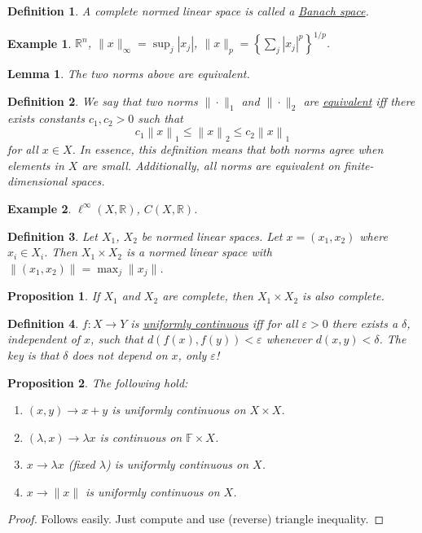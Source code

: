 \documentclass[letterpaper,twoside,11pt]{article}
\theoremstyle{mystyle}
\newtheorem{definition}{Definition}[section]
\newtheorem{lemma}[theorem]{Lemma}
\newtheorem{prop}{Proposition}[section]
\newtheorem*{ex}{Example}
\newcommand{\R}{{\mathbb R}}
\begin{document}
\begin{definition}
  A complete normed linear space is called a \underline{Banach space}. 
\end{definition}
\begin{ex}
  $\R^n$, $\|x\|_\infty = \sup_j |x_j|$, $\|x\|_p = \left\{\sum_j |x_j|^p\right\}^{1/p}$. 
\end{ex}
\begin{lemma}
  The two norms above are equivalent. 
\end{lemma}
\begin{definition}
  We say that two norms $\|\cdot\|_1$ and $\|\cdot\|_2$ are \underline{equivalent} iff there exists constants $c_1, c_2>0$ such that 
  \[{c_1}{\left\| x \right\|_1} \leq {\left\| x \right\|_2} \leq {c_2}{\left\| x \right\|_1}\] for all $x\in X$. 
  In essence, this definition means that both norms agree when elements in $X$ are small. Additionally, all norms are equivalent on finite-dimensional spaces. 
\end{definition}
\begin{ex}
  $\ell^\infty (X,\R)$, $C(X,\R)$. 
\end{ex}
\begin{definition}
  Let $X_1$, $X_2$ be normed linear spaces. Let $x = (x_1, x_2)$ where $x_i\in X_i$. Then $X_1 \times X_2$ is a normed linear space with $\|(x_1, x_2)\| = \max_j \|x_j\|$. 
\end{definition}
\begin{prop}
  If $X_1$ and $X_2$ are complete, then $X_1\times X_2$ is also complete. 
\end{prop}
\begin{definition}
  $f:X\to Y$ is \underline{uniformly continuous} iff for all $\varepsilon >0$ there exists a $\delta$, independent of $x$, such that $d(f(x),f(y)) < \varepsilon$ whenever $d(x,y)<\delta$. The key is that $\delta$ does not depend on $x$, only $\varepsilon$!
\end{definition}
\begin{prop} The following hold: 
  \begin{enumerate}
    \item $(x,y) \to x + y$ is uniformly continuous on $X\times X$. 
    \item $(\lambda, x)\to \lambda x$ is continuous on $\mathbb F \times X$. 
    \item $x \to \lambda x$ (fixed $\lambda$) is uniformly continuous on $X$. 
    \item $x\to \|x\|$ is uniformly continuous on $X$. 
  \end{enumerate}
\end{prop}
\begin{proof}
  Follows easily. Just compute and use (reverse) triangle inequality. 
\end{proof}
\end{document}
